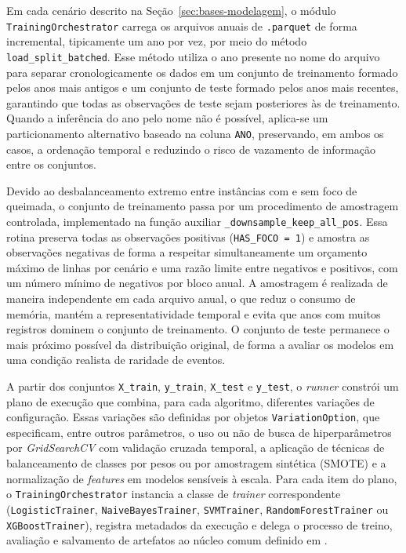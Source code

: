 Em cada cenário descrito na Seção~\ref{sec:bases-modelagem}, o módulo \texttt{TrainingOrchestrator} carrega os arquivos anuais de \texttt{.parquet} de forma incremental, tipicamente um ano por vez, por meio do método \texttt{load\_split\_batched}. Esse método utiliza o ano presente no nome do arquivo para separar cronologicamente os dados em um conjunto de treinamento formado pelos anos mais antigos e um conjunto de teste formado pelos anos mais recentes, garantindo que todas as observações de teste sejam posteriores às de treinamento. Quando a inferência do ano pelo nome não é possível, aplica-se um particionamento alternativo baseado na coluna \texttt{ANO}, preservando, em ambos os casos, a ordenação temporal e reduzindo o risco de vazamento de informação entre os conjuntos.

Devido ao desbalanceamento extremo entre instâncias com e sem foco de queimada, o conjunto de treinamento passa por um procedimento de amostragem controlada, implementado na função auxiliar \texttt{\_downsample\_keep\_all\_pos}. Essa rotina preserva todas as observações positivas (\texttt{HAS\_FOCO = 1}) e amostra as observações negativas de forma a respeitar simultaneamente um orçamento máximo de linhas por cenário e uma razão limite entre negativos e positivos, com um número mínimo de negativos por bloco anual. A amostragem é realizada de maneira independente em cada arquivo anual, o que reduz o consumo de memória, mantém a representatividade temporal e evita que anos com muitos registros dominem o conjunto de treinamento. O conjunto de teste permanece o mais próximo possível da distribuição original, de forma a avaliar os modelos em uma condição realista de raridade de eventos.

A partir dos conjuntos \texttt{X\_train}, \texttt{y\_train}, \texttt{X\_test} e \texttt{y\_test}, o \textit{runner} constrói um plano de execução que combina, para cada algoritmo, diferentes variações de configuração. Essas variações são definidas por objetos \texttt{VariationOption}, que especificam, entre outros parâmetros, o uso ou não de busca de hiperparâmetros por \textit{GridSearchCV} com validação cruzada temporal, a aplicação de técnicas de balanceamento de classes por pesos ou por amostragem sintética (SMOTE) e a normalização de \textit{features} em modelos sensíveis à escala. Para cada item do plano, o \texttt{TrainingOrchestrator} instancia a classe de \textit{trainer} correspondente (\texttt{LogisticTrainer}, \texttt{NaiveBayesTrainer}, \texttt{SVMTrainer}, \texttt{RandomForestTrainer} ou \texttt{XGBoostTrainer}), registra metadados da execução e delega o processo de treino, avaliação e salvamento de artefatos ao núcleo comum definido em .

